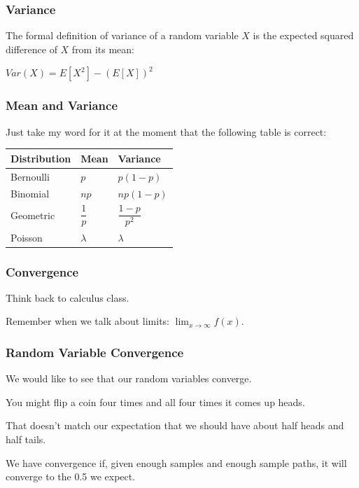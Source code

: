 \begin{frame}
\frametitle{Variance}

The formal definition of variance of a random variable $X$ is the expected squared difference of $X$ from its mean:

\begin{center}
	$Var(X) = E[X^{2}] - (E[X])^{2}$
\end{center}


\end{frame}



\begin{frame}
\frametitle{Mean and Variance}

Just take my word for it at the moment that the following table is correct:

\begin{center}
\begin{tabular}{|l|l|l|}
	\hline
	\textbf{Distribution} & \textbf{Mean} & \textbf{Variance}\\ \hline
	Bernoulli & $p$ & $p(1-p)$\\ \hline
	Binomial & $np$ & $np(1-p)$\\ \hline
	Geometric & $\dfrac{1}{p}$ & $\dfrac{1-p}{p^{2}}$ \\ \hline
	Poisson & $\lambda$ & $\lambda$\\ \hline
\end{tabular}
\end{center}

\end{frame}



\begin{frame}
\frametitle{Convergence}

Think back to calculus class. 

Remember when we talk about limits: $\lim_{x\to\infty} f(x)$. 


\end{frame}



\begin{frame}
\frametitle{Random Variable Convergence}

We would like to see that our random variables converge. 

You might flip a coin four times and all four times it comes up heads. 

That doesn't match our expectation that we should have about half heads and half tails.

We have convergence if, given enough samples and enough sample paths, it will converge to the 0.5 we expect. 

\end{frame}


